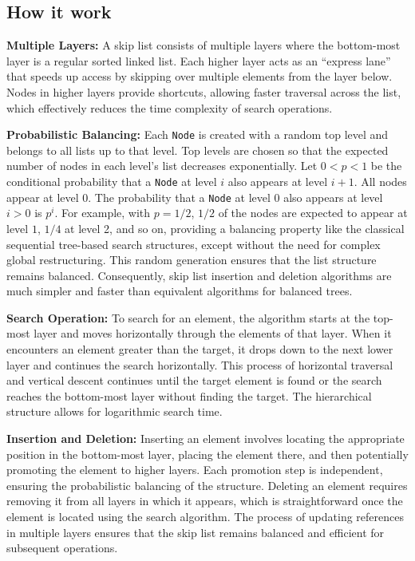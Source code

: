 \subsection*{How it work}

\textbf{Multiple Layers:} A skip list consists of multiple layers where the bottom-most layer is a regular sorted linked list. Each higher layer acts as an “express lane” that speeds up access by skipping over multiple elements from the layer below. Nodes in higher layers provide shortcuts, allowing faster traversal across the list, which effectively reduces the time complexity of search operations.

\textbf{Probabilistic Balancing:} Each \texttt{Node} is created with a random top level and belongs to all lists up to that level. Top levels are chosen so that the expected number of nodes in each level's list decreases exponentially. Let \(0 < p < 1\) be the conditional probability that a \texttt{Node} at level \(i\) also appears at level \(i + 1\). All nodes appear at level \(0\). The probability that a \texttt{Node} at level 0 also appears at level \(i > 0\) is \( p^i\). For example, with \(p = 1/2\), \(1/2\) of the nodes are expected to appear at level \(1\), \(1/4\) at level 2, and so on, providing a balancing property like the classical sequential tree-based search structures, except without the need for complex global restructuring. This random generation ensures that the list structure remains balanced. Consequently, skip list insertion and deletion algorithms are much simpler and faster than equivalent algorithms for balanced trees.

\textbf{Search Operation:} To search for an element, the algorithm starts at the top-most layer and moves horizontally through the elements of that layer. When it encounters an element greater than the target, it drops down to the next lower layer and continues the search horizontally. This process of horizontal traversal and vertical descent continues until the target element is found or the search reaches the bottom-most layer without finding the target. The hierarchical structure allows for logarithmic search time.

\textbf{Insertion and Deletion:} Inserting an element involves locating the appropriate position in the bottom-most layer, placing the element there, and then potentially promoting the element to higher layers. Each promotion step is independent, ensuring the probabilistic balancing of the structure. Deleting an element requires removing it from all layers in which it appears, which is straightforward once the element is located using the search algorithm. The process of updating references in multiple layers ensures that the skip list remains balanced and efficient for subsequent operations.

